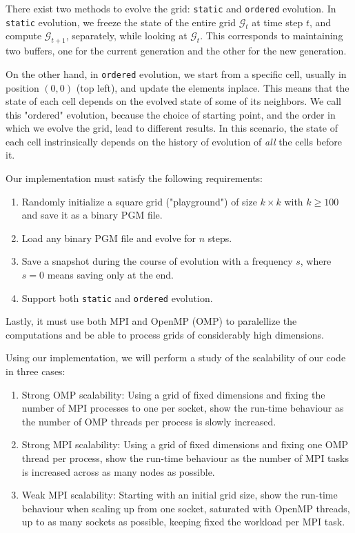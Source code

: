 \documentclass{report}
\begin{document}
There exist two methods to evolve the grid: \texttt{static} and \texttt{ordered}
evolution. In \texttt{static} evolution, we freeze the state of the entire grid 
$\mathcal{G}_t$ at time step $t$, and compute $\mathcal{G}_{t+1}$, separately, 
while looking at $\mathcal{G}_t$. This corresponds to maintaining two buffers, 
one for the current generation and the other for the new generation.

On the other hand, in \texttt{ordered} evolution, we start from a specific cell, 
usually in position $(0,0)$ (top left), and update the elements inplace. This 
means that the state of each cell depends on the evolved state of some of its 
neighbors. We call this "ordered" evolution, because the choice of starting 
point, and the order in which we evolve the grid, lead to different results.
In this scenario, the state of each cell instrinsically depends on the history of 
evolution of \textit{all} the cells before it. 

Our implementation must satisfy the following requirements: 

\begin{enumerate}
    \item Randomly initialize a square grid ("playground") of size $k \times k$ 
        with $k \geq 100$ and save it as a binary PGM\cite{pgm} file.
    \item Load any binary PGM file and evolve for $n$ steps.
    \item Save a snapshot during the course of evolution with a frequency $s$, 
        where $s=0$ means saving only at the end. 
    \item Support both \texttt{static} and \texttt{ordered} evolution.
\end{enumerate}

Lastly, it must use both MPI\cite{mpi} and OpenMP\cite{omp} (OMP) to paralellize 
the computations and be able to process grids of considerably high dimensions. 

Using our implementation, we will perform a study of the scalability of our code 
in three cases: 
\begin{enumerate}
    \item Strong OMP scalability: Using a grid of fixed dimensions and fixing the 
        number of MPI processes to one per socket, show the run-time behaviour as 
        the number of OMP threads per process is slowly increased. 
    \item Strong MPI scalability: Using a grid of fixed dimensions and fixing 
        one OMP thread per process, show the run-time behaviour as the number of 
        MPI tasks is increased across as many nodes as possible.
    \item Weak MPI scalability: Starting with an initial grid size, show the run-time 
        behaviour when scaling up from one socket, saturated with OpenMP threads,
        up to as many sockets as possible, keeping fixed the workload per MPI task.
\end{enumerate}
\end{document}
